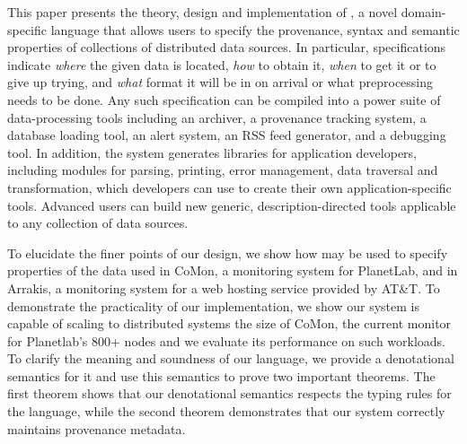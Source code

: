 
This paper presents the theory, design and implementation of
\padsd{}, a novel domain-specific language that allows users to
specify the provenance, syntax and semantic properties of 
collections of distributed 
data sources.  In particular, \padsd{} specifications indicate
{\em where} the given data is located, {\em how} to obtain it, {\em
when} to get it or to give up trying, and {\em what}
format it will be in on arrival or what preprocessing 
needs to be done.  Any such specification can be compiled into
a power suite of data-processing tools including 
an archiver, a provenance tracking system, a database loading tool, 
an alert system, an RSS feed generator, and a
debugging tool.  In addition, the system generates libraries for
application developers, including modules for parsing, printing, error
management, data traversal and transformation, which developers can use
to create their own application-specific tools.  Advanced users can
build new generic, description-directed tools applicable to any 
collection of data sources.

To elucidate the finer points of our design, we show how \padsd{} may
be used to specify properties of the data used in 
CoMon, a monitoring system for PlanetLab, and in Arrakis, a monitoring
system for a web hosting service provided by AT\&T.  
To demonstrate the practicality of our implementation, we show our system is
capable of scaling to distributed systems the size of CoMon,
the current monitor for Planetlab's 800+ nodes and we evaluate its
performance on such workloads.  To clarify the
meaning and soundness of our language, we provide a
denotational semantics for it and use this semantics to prove two important
theorems.  The first theorem shows that our denotational semantics respects the
typing rules for the language, while the second theorem demonstrates that our 
system correctly maintains provenance metadata.






